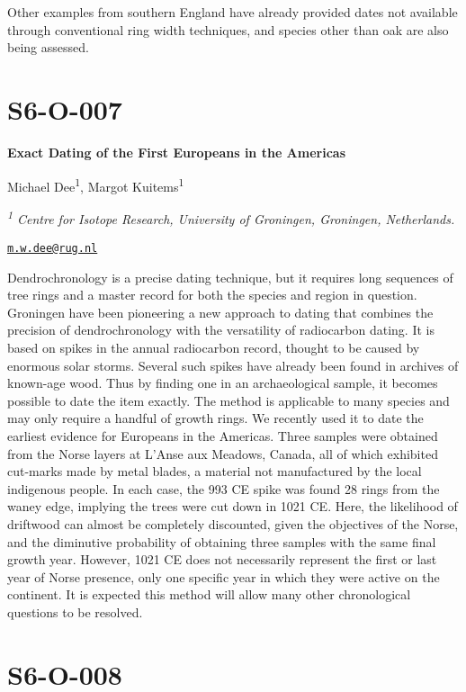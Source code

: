 \documentclass[
]{book}
\begin{document}
Other examples from southern England have already provided dates not available through conventional ring width techniques, and species other than oak are also being assessed.

\hypertarget{s6-o-007}{%
\section*{S6-O-007}\label{s6-o-007}}

\textbf{Exact Dating of the First Europeans in the Americas}

Michael Dee\textsuperscript{1}, Margot Kuitems\textsuperscript{1}

\emph{\textsuperscript{1} Centre for Isotope Research, University of Groningen, Groningen, Netherlands.}

\href{mailto:m.w.dee@rug.nl}{\nolinkurl{m.w.dee@rug.nl}}

Dendrochronology is a precise dating technique, but it requires long sequences of tree rings and a master record for both the species and region in question. Groningen have been pioneering a new approach to dating that combines the precision of dendrochronology with the versatility of radiocarbon dating. It is based on spikes in the annual radiocarbon record, thought to be caused by enormous solar storms. Several such spikes have already been found in archives of known-age wood. Thus by finding one in an archaeological sample, it becomes possible to date the item exactly. The method is applicable to many species and may only require a handful of growth rings. We recently used it to date the earliest evidence for Europeans in the Americas. Three samples were obtained from the Norse layers at L'Anse aux Meadows, Canada, all of which exhibited cut-marks made by metal blades, a material not manufactured by the local indigenous people. In each case, the 993 CE spike was found 28 rings from the waney edge, implying the trees were cut down in 1021 CE. Here, the likelihood of driftwood can almost be completely discounted, given the objectives of the Norse, and the diminutive probability of obtaining three samples with the same final growth year. However, 1021 CE does not necessarily represent the first or last year of Norse presence, only one specific year in which they were active on the continent. It is expected this method will allow many other chronological questions to be resolved.

\hypertarget{s6-o-008}{%
\section*{S6-O-008}\label{s6-o-008}}
\end{document}

